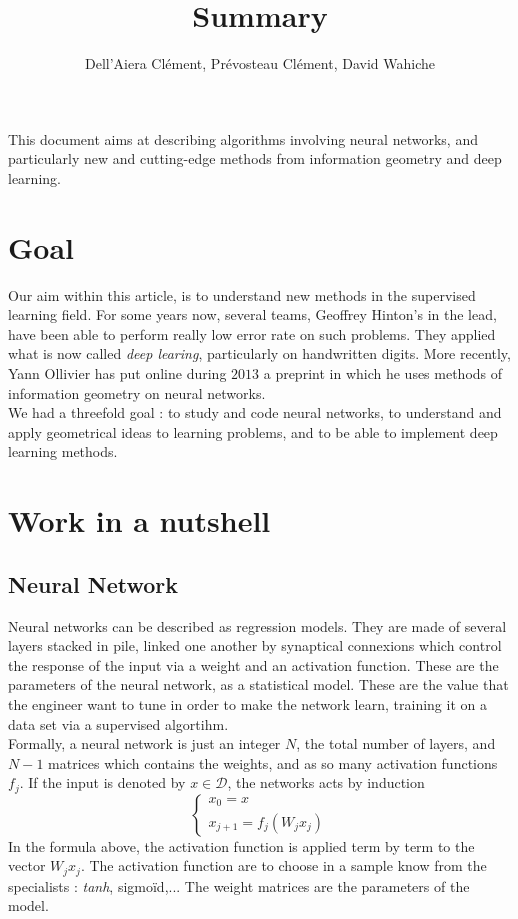 \documentclass{article}
\title{Summary}
\author{Dell'Aiera Clément, Prévosteau Clément, David Wahiche}
\date{}
\begin{document}
\maketitle


This document aims at describing algorithms involving neural networks, and particularly new and cutting-edge methods from information geometry and deep learning.

\section{Goal}

Our aim within this article, is to understand new methods in the supervised learning field. For some years now, several teams, Geoffrey Hinton's in the lead, have been able to perform really low error rate on such problems. They applied what is now called \textit{deep learing}, particularly on handwritten digits. More recently, Yann Ollivier has put online during $2013$ a preprint in which he uses methods of information geometry on neural networks.\\

We had a threefold goal : to study and code neural networks, to understand and apply geometrical ideas to learning problems, and to be able to implement deep learning methods.


\section{Work in a nutshell}

\subsection{Neural Network}

Neural networks can be described as regression models. They are made of several layers stacked in pile, linked one another by synaptical connexions which control the response of the input via a weight and an activation function. These are the parameters of the neural network, as a statistical model. These are the value that the engineer want to tune in order to make the network learn, training it on a data set via a supervised algortihm.\\

Formally, a neural network is just an integer $N$, the total number of layers, and $N-1$ matrices which contains the weights, and as so many activation functions $f_j$. If the input is denoted by $x\in \mathcal D$, the networks acts by induction
\[\left\{\begin{array}{c}x_0=x\\ x_{j+1}=f_j(W_j x_j)\end{array}\right.\]
In the formula above, the activation function is applied term by term to the vector $W_j x_j$. The activation function are to choose in a sample know from the specialists : \textit{tanh}, sigmoïd,... The weight matrices are the parameters of the model.\\
\end{document}
